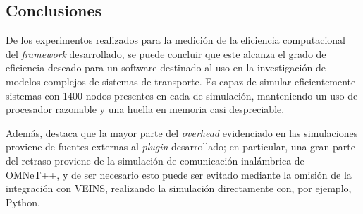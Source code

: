 \subsection{Conclusiones}

De los experimentos realizados para la medición de la eficiencia computacional del \emph{framework} desarrollado, se puede concluir que este alcanza el grado de eficiencia deseado para un software destinado al uso en la investigación de modelos complejos de sistemas de transporte. Es capaz de simular eficientemente sistemas con 1400 nodos presentes en cada de simulación, manteniendo un uso de procesador razonable y una huella en memoria casi despreciable. 

Además, destaca que la mayor parte del \emph{overhead} evidenciado en las simulaciones proviene de fuentes externas al \emph{plugin} desarrollado; en particular, una gran parte del retraso proviene de la simulación de comunicación inalámbrica de OMNeT++, y de ser necesario esto puede ser evitado mediante la omisión de la integración con VEINS, realizando la simulación directamente con, por ejemplo, Python.
